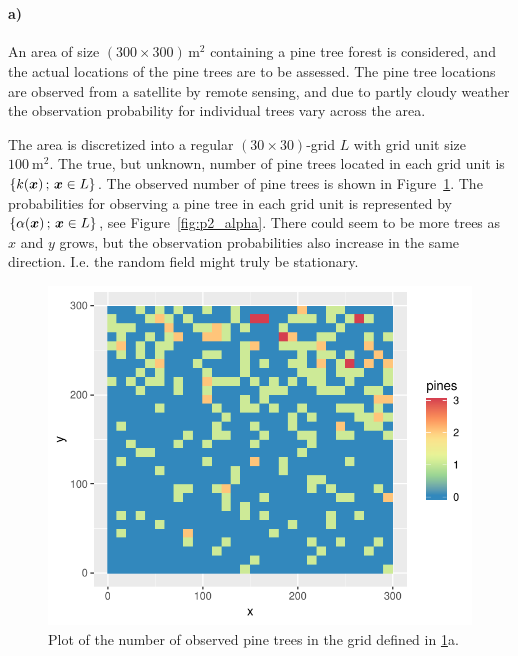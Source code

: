 \section{}
\label{sec:problem2}

\paragraph{a)}
An area of size $(300 \times 300) \, \si{\meter^2}$ containing a pine tree forest is considered, and the actual locations of the pine trees are to be assessed. The pine tree locations are observed from a satellite by remote sensing, and due to partly cloudy weather the observation probability for individual trees vary across the area.

The area is discretized into a regular $(30 \times 30)$-grid $L$ with grid unit size $\SI{100}{\meter^2}$. The true, but unknown, number of pine trees located in each grid unit is \newline $\{k(\bm{x}) \,;\, \bm{x} \in L\}$. The observed number of pine trees is shown in Figure~\ref{fig:p2_pines}. The probabilities for observing a pine tree in each grid unit is represented by $\{\alpha(\bm{x}) \,;\, \bm{x} \in L\}$, see Figure~\ref{fig:p2_alpha}. There could seem to be more trees as $x$ and $y$ grows, but the observation probabilities also increase in the same direction. I.e. the random field might truly be stationary.

\begin{figure}
    \centering
    \includegraphics{figures/p2_pines.pdf}
    \caption{Plot of the number of observed pine trees in the grid defined in \ref{sec:problem2}a.}
    \label{fig:p2_pines}
\end{figure}

